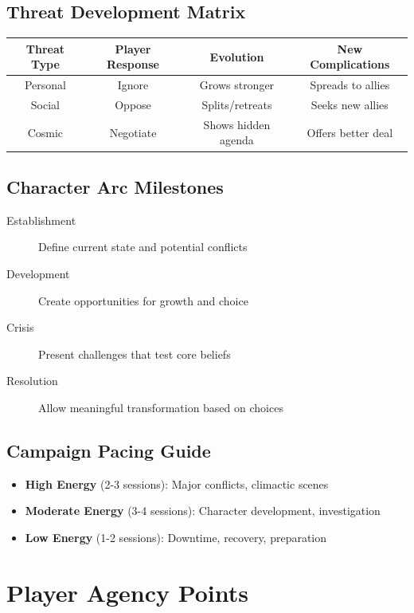 \documentclass[11pt]{article}
\begin{document}
\subsection{Threat Development Matrix}

\begin{center}
\begin{longtable}{|c|c|c|c|}
\hline
\textbf{Threat Type} & \textbf{Player Response} & \textbf{Evolution} & \textbf{New Complications} \\
\hline
Personal & Ignore & Grows stronger & Spreads to allies \\
\hline
Social & Oppose & Splits/retreats & Seeks new allies \\
\hline
Cosmic & Negotiate & Shows hidden agenda & Offers better deal \\
\hline
\end{longtable}
\end{center}

\subsection{Character Arc Milestones}

\begin{description}
  \item[Establishment] Define current state and potential conflicts
  \item[Development] Create opportunities for growth and choice
  \item[Crisis] Present challenges that test core beliefs
  \item[Resolution] Allow meaningful transformation based on choices
\end{description}

\subsection{Campaign Pacing Guide}

\begin{itemize}
  \item \textbf{High Energy} (2-3 sessions): Major conflicts, climactic scenes
  \item \textbf{Moderate Energy} (3-4 sessions): Character development, investigation
  \item \textbf{Low Energy} (1-2 sessions): Downtime, recovery, preparation
\end{itemize}

\section{Player Agency Points}
\label{sec:player-agency-points}
\end{document}
